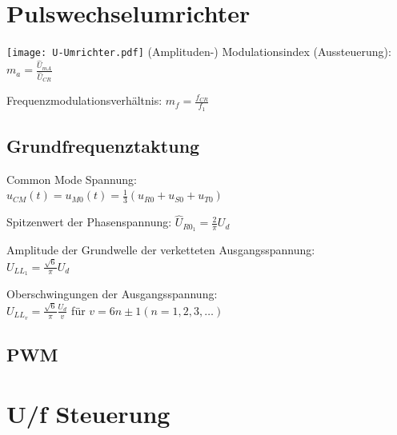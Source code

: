 \documentclass[german]{latex4ei_fs}
\begin{document}
\section{Pulswechselumrichter}
\begin{sectionbox}

\texttt{[image: U-Umrichter.pdf]}
(Amplituden-) Modulationsindex (Aussteuerung): $m_a = \frac{\hat U_{mA}}{\hat U_{CR}}$

Frequenzmodulationsverhältnis: $m_f = \frac{f_{CR}}{f_1}$

\subsection{Grundfrequenztaktung}
Common Mode Spannung: \\
$u_{CM} (t) = u_{M0} (t) = \frac{1}{3} (u_{R0} + u_{S0} + u_{T0})$

Spitzenwert der Phasenspannung:
$\hat U_{R0_1} = \frac{2}{\pi} U_d$


Amplitude der Grundwelle der verketteten Ausgangsspannung: \\
$U_{LL_1} = \frac{\sqrt 6}{\pi} U_d$

Oberschwingungen der Ausgangsspannung: \\
$U_{LL_v} = \frac{\sqrt 6}{\pi} \frac{U_d}{v}$ für $v = 6n \pm 1 (n = 1, 2, 3, \ldots)$
\subsection{PWM}  
\end{sectionbox}

\section{U/f Steuerung}
\end{document}

